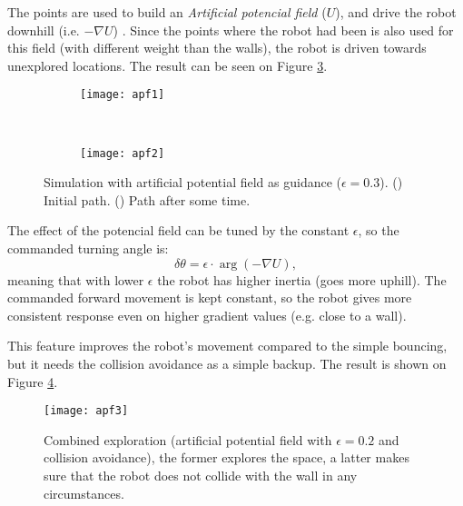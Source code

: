 		The points are used to build an \textit{Artificial potencial field} ($U$), and drive the robot downhill (i.e. $-\nabla U$) \parencite{choset_principles_2005}. Since the points where the robot had been is also used for this field (with different weight than the walls), the robot is driven towards unexplored locations. The result can be seen on Figure \ref{fig:apf}.
		
		\begin{figure}[h]
		    \centering
		    \begin{subfigure}[b]{0.48\textwidth}
   	 			\texttt{[image: apf1]}
   	 			\caption{}
				\label{fig:apf1}
   	 		\end{subfigure}		    
		    ~
		    \begin{subfigure}[b]{0.48\textwidth}
   	 			\texttt{[image: apf2]}
   	 			\caption{}
 				\label{fig:apf2}
   	 		\end{subfigure}
		     
		    \caption{Simulation with artificial potential field as guidance ($\epsilon=0.3$). (\protect{}) Initial path. (\protect{}) Path after some time.}
		    \label{fig:apf}
	 	\end{figure}
	 	
	 	
	 	
	 	The effect of the potencial field can be tuned by the constant $\epsilon$, so the commanded turning angle is:
	 	\begin{equation}
			\delta \theta=\epsilon\cdot\arg(-\nabla U),
	 	\end{equation}
	 	meaning that with lower $\epsilon$ the robot has higher inertia (goes more uphill). The commanded forward movement is kept constant, so the robot gives more consistent response even on higher gradient values (e.g. close to a wall).
	 	
	 	
	 	This feature improves the robot's movement compared to the simple bouncing, but it needs the collision avoidance as a simple backup. The result is shown on Figure \ref{fig:apf3}.

		
		\begin{figure}[h]
			\centering
			\texttt{[image: apf3]}
			
			\caption{Combined exploration (artificial potential field with $\epsilon=0.2$ and collision avoidance), the former explores the space, a latter makes sure that the robot does not collide with the wall in any circumstances.}
			\label{fig:apf3}
	 	\end{figure}
	 	
